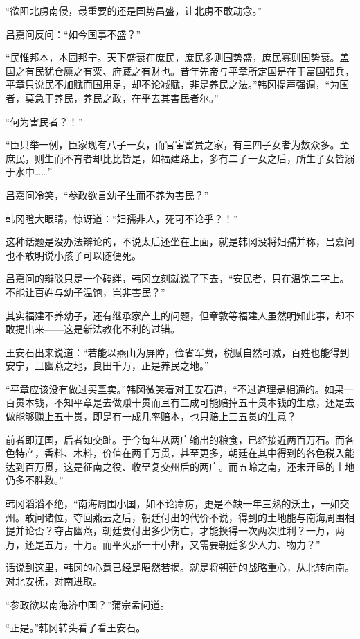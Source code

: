 “欲阻北虏南侵，最重要的还是国势昌盛，让北虏不敢动念。”

吕嘉问反问：“如今国事不盛？”

“民惟邦本，本固邦宁。天下盛衰在庶民，庶民多则国势盛，庶民寡则国势衰。盖国之有民犹仓廪之有粟、府藏之有财也。昔年先帝与平章所定国是在于富国强兵，平章只说民不加赋而国用足，却不论减赋，非是养民之法。”韩冈提声强调，“为国者，莫急于养民，养民之政，在乎去其害民者尔。”

“何为害民者？！”

“臣只举一例，臣家现有八子一女，而官宦富贵之家，有三四子女者为数众多。至庶民，则生而不育者却比比皆是，如福建路上，多有二子一女之后，所生子女皆溺于水中……”

吕嘉问冷笑，“参政欲言幼子生而不养为害民？”

韩冈瞪大眼睛，惊讶道：“妇孺非人，死可不论乎？！”

这种话题是没办法辩论的，不说太后还坐在上面，就是韩冈没将妇孺并称，吕嘉问也不敢明说小孩子可以随便死。

吕嘉问的辩驳只是一个磕绊，韩冈立刻就说了下去，“安民者，只在温饱二字上。不能让百姓与幼子温饱，岂非害民？”

其实福建不养幼子，还有继承家产上的问题，但章敦等福建人虽然明知此事，却不敢提出来——这是新法教化不利的过错。

王安石出来说道：“若能以燕山为屏障，俭省军费，税赋自然可减，百姓也能得到安宁，且幽燕之地，良田千万，正是养民之地。”

“平章应该没有做过买垩卖。”韩冈微笑着对王安石道，“不过道理是相通的。如果一百贯本钱，不知平章是去做赚十贯而且有三成可能赔掉五十贯本钱的生意，还是去做能够赚上五十贯，即是有一成几率赔本，也只赔上三五贯的生意？

前者即辽国，后者如交趾。于今每年从两广输出的粮食，已经接近两百万石。而各色特产，香料、木料，价值在两千万贯，甚至更多，朝廷在其中得到的各色税入能达到百万贯，这是征南之役、收垩复交州后的两广。而五岭之南，还未开垦的土地仍多不胜数。”

韩冈滔滔不绝，“南海周围小国，如不论瘴疠，更是不缺一年三熟的沃土，一如交州。敢问诸位，夺回燕云之后，朝廷付出的代价不说，得到的土地能与南海周围相提并论否？夺占幽燕，朝廷要付出多少伤亡，才能换得一次两次胜利？一万，两万，还是五万，十万。而平灭那一干小邦，又需要朝廷多少人力、物力？”

话说到这里，韩冈的心意已经是昭然若揭。就是将朝廷的战略重心，从北转向南。对北安抚，对南进取。

“参政欲以南海济中国？”蒲宗孟问道。

“正是。”韩冈转头看了看王安石。

